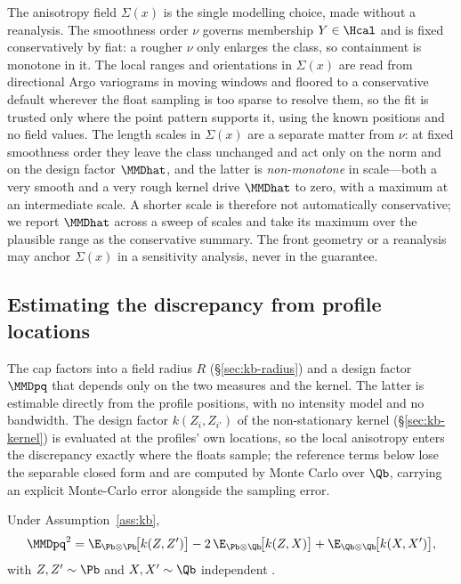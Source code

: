 The anisotropy field $\Sigma(x)$ is the single modelling choice, made without a
reanalysis. The smoothness order $\nu$ governs membership $Y\in\Hcal$ and is fixed
conservatively by fiat: a rougher $\nu$ only enlarges the class, so containment is
monotone in it. The local ranges and orientations in $\Sigma(x)$ are read from
directional Argo variograms in moving windows and floored to a conservative default
wherever the float sampling is too sparse to resolve them, so the fit is trusted
only where the point pattern supports it, using the known positions and no field
values. The length scales in $\Sigma(x)$ are a separate matter from $\nu$: at fixed
smoothness order they leave the class unchanged and act only on the norm and on the
design factor $\MMDhat$, and the latter is \emph{non-monotone} in scale---both a
very smooth and a very rough kernel drive $\MMDhat$ to zero, with a maximum at an
intermediate scale. A shorter scale is therefore not automatically conservative; we
report $\MMDhat$ across a sweep of scales and take its maximum over the plausible
range as the conservative summary. The front geometry or a reanalysis may anchor
$\Sigma(x)$ in a sensitivity analysis, never in the guarantee.

\subsection{Estimating the discrepancy from profile locations}
\label{sec:kb-estimation}

The cap factors into a field radius $R$ (\S\ref{sec:kb-radius}) and a design
factor $\MMDpq$ that depends only on the two measures and the kernel. The latter
is estimable directly from the profile positions, with no intensity model and no
bandwidth. The design factor $k(Z_i,Z_{i'})$ of the non-stationary kernel
(\S\ref{sec:kb-kernel}) is evaluated at the profiles' own locations, so the local
anisotropy enters the discrepancy exactly where the floats sample; the reference
terms below lose the separable closed form and are computed by Monte Carlo over
$\Qb$, carrying an explicit Monte-Carlo error alongside the sampling error.

\begin{proposition}
\label{prop:kb-mmd}
Under Assumption~\ref{ass:kb},
\begin{equation}
  \MMDpq^{2}
  =\E_{\Pb\otimes\Pb}\!\big[k(Z,Z')\big]
    -2\,\E_{\Pb\otimes\Qb}\!\big[k(Z,X)\big]
    +\E_{\Qb\otimes\Qb}\!\big[k(X,X')\big],
  \label{eq:kb-mmd}
\end{equation}
with $Z,Z'\sim\Pb$ and $X,X'\sim\Qb$ independent
\citep[eq.~3.30]{muandet2017}.
\end{proposition}

